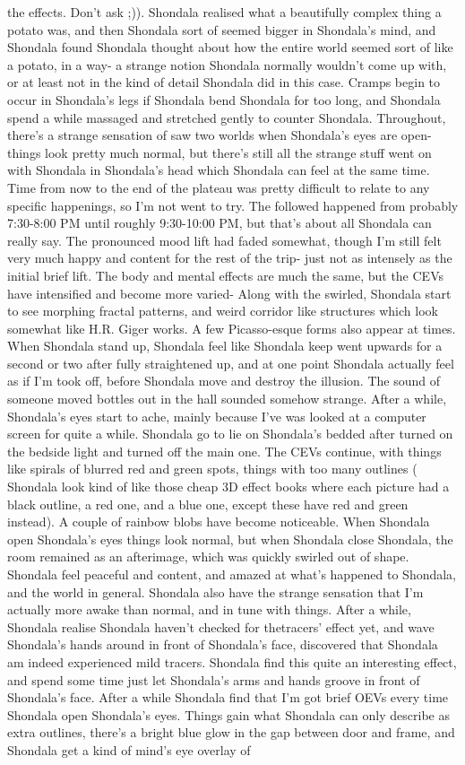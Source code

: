 \documentclass[12pt]{book}
\begin{document}
the effects. Don't ask ;)). Shondala realised what a beautifully complex thing a potato was, and then Shondala sort of seemed bigger in Shondala's mind, and Shondala found Shondala thought about how the entire world seemed sort of like a potato, in a way- a strange notion Shondala normally wouldn't come up with, or at least not in the kind of detail Shondala did in this case. Cramps begin to occur in Shondala's legs if Shondala bend Shondala for too long, and Shondala spend a while massaged and stretched gently to counter Shondala. Throughout, there's a strange sensation of saw two worlds when Shondala's eyes are open- things look pretty much normal, but there's still all the strange stuff went on with Shondala in Shondala's head which Shondala can feel at the same time. Time from now to the end of the plateau was pretty difficult to relate to any specific happenings, so I'm not went to try. The followed happened from probably 7:30-8:00 PM until roughly 9:30-10:00 PM, but that's about all Shondala can really say. The pronounced mood lift had faded somewhat, though I'm still felt very much happy and content for the rest of the trip- just not as intensely as the initial brief lift. The body and mental effects are much the same, but the CEVs have intensified and become more varied- Along with the swirled, Shondala start to see morphing fractal patterns, and weird corridor like structures which look somewhat like H.R. Giger works. A few Picasso-esque forms also appear at times. When Shondala stand up, Shondala feel like Shondala keep went upwards for a second or two after fully straightened up, and at one point Shondala actually feel as if I'm took off, before Shondala move and destroy the illusion. The sound of someone moved bottles out in the hall sounded somehow strange. After a while, Shondala's eyes start to ache, mainly because I've was looked at a computer screen for quite a while. Shondala go to lie on Shondala's bedded after turned on the bedside light and turned off the main one. The CEVs continue, with things like spirals of blurred red and green spots, things with too many outlines ( Shondala look kind of like those cheap 3D effect books where each picture had a black outline, a red one, and a blue one, except these have red and green instead). A couple of rainbow blobs have become noticeable. When Shondala open Shondala's eyes things look normal, but when Shondala close Shondala, the room remained as an afterimage, which was quickly swirled out of shape. Shondala feel peaceful and content, and amazed at what's happened to Shondala, and the world in general. Shondala also have the strange sensation that I'm actually more awake than normal, and in tune with things. After a while, Shondala realise Shondala haven't checked for thetracers' effect yet, and wave Shondala's hands around in front of Shondala's face, discovered that Shondala am indeed experienced mild tracers. Shondala find this quite an interesting effect, and spend some time just let Shondala's arms and hands groove in front of Shondala's face. After a while Shondala find that I'm got brief OEVs every time Shondala open Shondala's eyes. Things gain what Shondala can only describe as extra outlines, there's a bright blue glow in the gap between door and frame, and Shondala get a kind of mind's eye overlay of 
\end{document}
